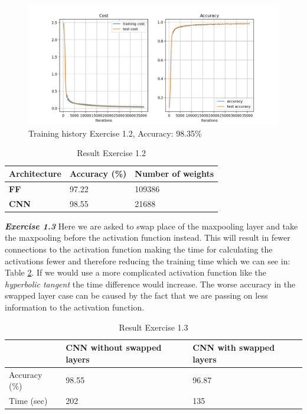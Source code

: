 \documentclass[a4paper,10pt]{article}
\begin{document}
\begin{figure}[ht!]
\centering
\includegraphics[width=120mm]{figures/assignment_3/convnet.png}
\caption{Training history Exercise 1.2, Accuracy: 98.35\%}
\label{fig:convnet1}
\end{figure}

\begin{table}[ht!]
\centering
\begin{tabular}{lll}\hline
 \textbf{Architecture}&  Accuracy (\%)& Number of weights  \\ \hline
 \textbf{FF}&  97.22&  109386\\ 
 \textbf{CNN}& 98.55& 21688 \\\hline
\end{tabular}
\caption{Result Exercise 1.2}
\label{tab:tab4}
\end{table}

\newpage

\textit{\textbf{Exercise 1.3}} Here we are asked to swap place of the maxpooling layer and take the maxpooling before the activation function instead. This will result in fewer connections to the activation function making the time for calculating the activations fewer and therefore reducing the training time which we can see in: Table \ref{tab:tab5}. If we would use a more complicated activation function like the \emph{hyperbolic tangent} the time difference would increase. The worse accuracy in the swapped layer case can be caused by the fact that we are passing on less information to the activation function. 



\begin{table}[ht!]
\centering
\begin{tabular}{lll}\hline
 &  \textbf{CNN without swapped layers}& \textbf{CNN with swapped layers} \\ \hline
 Accuracy (\%) &98.55  &96.87  \\
 Time (sec)&  202& 135\\ \hline
\end{tabular}
\caption{Result Exercise 1.3}
\label{tab:tab5}
\end{table}
\end{document}
